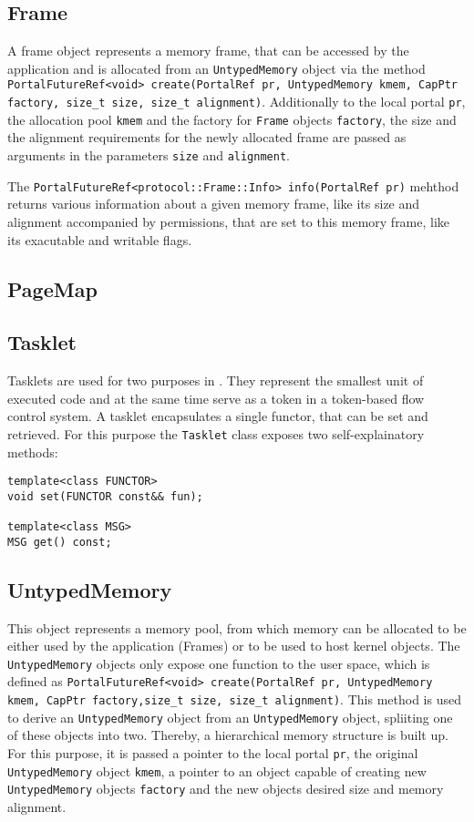 \subsection{Frame}
A frame object represents a memory frame, that can be accessed by the
application and is allocated from an \texttt{UntypedMemory} object via the
method \texttt{PortalFutureRef<void> create(PortalRef pr, UntypedMemory kmem,
CapPtr factory, size\_t size, size\_t alignment)}. Additionally to the local
portal \texttt{pr}, the allocation pool \texttt{kmem} and the factory for
\texttt{Frame} objects \texttt{factory}, the size and the alignment requirements
for the newly allocated frame are passed as arguments in the parameters
\texttt{size} and \texttt{alignment}.

The \texttt{PortalFutureRef<protocol::Frame::Info> info(PortalRef pr)} mehthod
returns various information about a given memory frame, like its size and
alignment accompanied by permissions, that are set to this memory frame, like
its exacutable and writable flags.

\subsection{PageMap}

\subsection{Tasklet}
Tasklets are used for two purposes in \mythos. They represent the smallest unit
of executed code and at the same time serve as a token in a token-based flow
control system. A tasklet encapsulates a single functor, that can be set and
retrieved. For this purpose the \texttt{Tasklet} class exposes two
self-explainatory methods:

\begin{lstlisting}
template<class FUNCTOR>
void set(FUNCTOR const&& fun);

template<class MSG>
MSG get() const;
\end{lstlisting}

\subsection{UntypedMemory}
This object represents a memory pool, from which memory can be allocated to be
either used by the application (Frames) or to be used to host kernel objects.
The \texttt{UntypedMemory} objects only expose one function to the user space,
which is defined as \texttt{PortalFutureRef<void> create(PortalRef pr,
UntypedMemory kmem, CapPtr factory,size\_t size, size\_t alignment)}. This
method is used to derive an \texttt{UntypedMemory} object from an
\texttt{UntypedMemory} object, spliiting one of these objects into two. Thereby,
a hierarchical memory structure is built up. For this purpose, it is passed a
pointer to the local portal \texttt{pr}, the original \texttt{UntypedMemory}
object \texttt{kmem}, a pointer to an object capable of creating new
\texttt{UntypedMemory} objects \texttt{factory} and the new objects desired size
and memory alignment.

